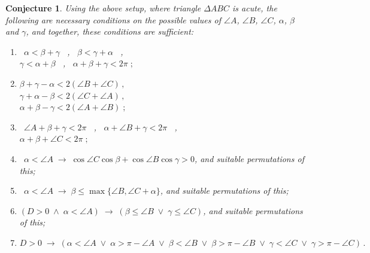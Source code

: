 \documentclass[a4paper, twoside]{article}
\newtheorem{conjecture}{Conjecture}
\begin{document}
\begin{conjecture} 

Using the above setup, where triangle $\Delta ABC$ is acute, the following are necessary conditions on the possible values of $\angle A$, $\angle B$, $\angle C$, $\alpha$, $\beta$ and $\gamma$, and together, these conditions are sufficient: 

\begin{enumerate} 

\item \ $\alpha < \beta + \gamma$ \, , \, $\beta < \gamma + \alpha$ \, , \\ $\gamma < \alpha + \beta$ \, , \, $\alpha + \beta + \gamma < 2 \pi \; ;$ 

\item $\beta + \gamma - \alpha < 2(\angle B + \angle C) \, ,$ \\
$\gamma + \alpha - \beta < 2(\angle C + \angle A) \, ,$ \\
$\alpha + \beta - \gamma < 2(\angle A + \angle B) \; ;$ 

\item \ $\angle A + \beta + \gamma < 2 \pi$ \, , \, $\alpha + \angle B + \gamma < 2 \pi$ \, , \\ $\alpha + \beta + \angle C < 2 \pi \; ;$ \\

\item \ $\alpha < \angle A \; \rightarrow \; \cos \angle C \cos \beta + \cos \angle B \cos \gamma > 0$,  and suitable permutations of this; 

\item \ $\alpha < \angle A \; \rightarrow \; \beta \le \max\{\angle B, \angle C+\alpha\}$, and suitable permutations of this;  \\

\item $( D > 0 \; \wedge \; \alpha < \angle A ) \; \rightarrow \; ( \beta \le \angle B \; \vee \; \gamma \le \angle C )$, and suitable permutations of this;

\item $ D > 0 \; \rightarrow \; ( \alpha < \angle A \; \vee \; \alpha > \pi - \angle A \; \vee \; 
\beta < \angle B \; \vee \; \beta > \pi - \angle B \; \vee \; \gamma < \angle C \; \vee \; \gamma > \pi - \angle C )\, .$ \\

\end{enumerate} 

\end{conjecture} 
\end{document}
